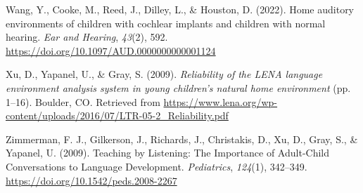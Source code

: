 \documentclass[
  man,floatsintext]{apa6}
\newlength{\cslhangindent}
\newenvironment{CSLReferences}[2] %
 {\begin{list}{}{%
  \setlength{\itemindent}{0pt}
  \setlength{\leftmargin}{0pt}
  \setlength{\parsep}{0pt}
  \ifodd #1
   \setlength{\leftmargin}{\cslhangindent}
   \setlength{\itemindent}{-1\cslhangindent}
  \fi
  \setlength{\itemsep}{#2\baselineskip}}}
 {\end{list}}
\begin{document}
\begin{CSLReferences}{1}{0}
Wang, Y., Cooke, M., Reed, J., Dilley, L., \& Houston, D. (2022). Home auditory environments of children with cochlear implants and children with normal hearing. \emph{Ear and Hearing}, \emph{43}(2), 592. \url{https://doi.org/10.1097/AUD.0000000000001124}

Xu, D., Yapanel, U., \& Gray, S. (2009). \emph{Reliability of the LENA language environment analysis system in young children{'}s natural home environment} (pp. 1--16). Boulder, CO. Retrieved from \url{https://www.lena.org/wp-content/uploads/2016/07/LTR-05-2_Reliability.pdf}

Zimmerman, F. J., Gilkerson, J., Richards, J., Christakis, D., Xu, D., Gray, S., \& Yapanel, U. (2009). Teaching by Listening: The Importance of Adult-Child Conversations to Language Development. \emph{Pediatrics}, \emph{124}(1), 342--349. \url{https://doi.org/10.1542/peds.2008-2267}

\end{CSLReferences}
\end{document}

